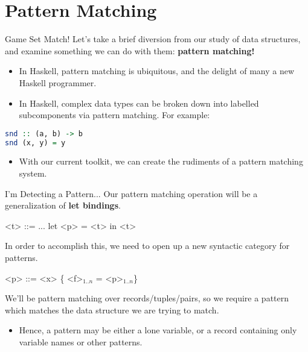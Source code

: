 \documentclass[11pt]{beamer}
\begin{document}
\section[Pattern Matching]{Pattern Matching}
\begin{frame}[fragile=singleslide]{Game Set Match!}
Let's take a brief diversion from our study of data structures, and examine something we can do with them: \textbf{pattern matching!}
\begin{itemize}
\item In Haskell, pattern matching is ubiquitous, and the delight of many a new Haskell programmer.  
\item In Haskell, complex data types can be broken down into labelled subcomponents via pattern matching.  For example:
\end{itemize}

\begin{lstlisting}[language=Haskell]
snd :: (a, b) -> b
snd (x, y) = y
\end{lstlisting}

\begin{itemize}
\item With our current toolkit, we can create the rudiments of a pattern matching system.  
\end{itemize}

\end{frame}


\begin{frame}[fragile=singleslide]{I'm Detecting a Pattern...}
Our pattern matching operation will be a generalization of \textbf{let bindings}.

\begin{grammar}
<t> ::= ...
\alt let <p> = <t> in <t>
\end{grammar}

In order to accomplish this, we need to open up a new syntactic category for patterns.

\begin{grammar}
<p> ::= <x>
\alt \{ <f>$_{1..n}$ = <p>$_{1..n}$\}
\end{grammar}

We'll be pattern matching over records/tuples/pairs, so we require a pattern which matches the data structure we are trying to match.  
\begin{itemize}
\item Hence, a pattern may be either a lone variable, or a record containing only variable names or other patterns.  
\end{itemize}
\end{frame}
\end{document}
